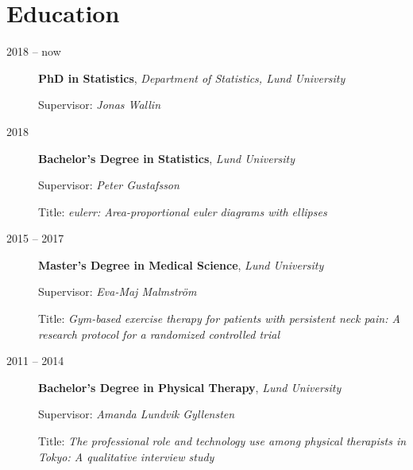 \documentclass[
  10pt,
  headsepline=true,
  english,
  DIV=12
]{scrartcl}
\renewcommand*{%
  \mkbibnamegiven
}[1]{\ifitemannotation{highlight}{\textbf{#1}}{#1}}
\renewcommand*{%
  \mkbibnamefamily
}[1]{\ifitemannotation{highlight}{\textbf{#1}}{#1}}
\begin{document}
\hypertarget{education}{%
  \section{Education}\label{education}}


\begin{description}
  \item[2018 -- now] {
        \textbf{PhD in Statistics}, \emph{Department of Statistics, Lund
          University}

        Supervisor: \emph{Jonas Wallin}
        }

  \item[2018] {
        \textbf{Bachelor's Degree in Statistics}, \emph{Lund University}

        Supervisor: \emph{Peter Gustafsson}

        Title: \emph{eulerr: Area-proportional euler diagrams with ellipses}
        }

  \item[2015 -- 2017] {
        \textbf{Master's Degree in Medical Science}, \emph{Lund University}

        Supervisor: \emph{Eva-Maj Malmström}

        Title: \emph{Gym-based exercise therapy for patients with persistent
          neck pain: A research protocol for a randomized controlled trial}
        }

  \item[2011 -- 2014] {
        \textbf{Bachelor's Degree in Physical Therapy}, \emph{Lund University}

        Supervisor: \emph{Amanda Lundvik Gyllensten}

        Title: \emph{The professional role and technology use among physical
          therapists in Tokyo: A qualitative interview study}
        }
\end{description}


\end{document}
